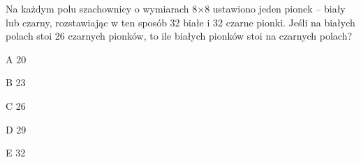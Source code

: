 \begin{tresc}
Na każdym polu szachownicy o wymiarach 8×8 ustawiono jeden pionek – biały lub czarny, rozstawiając w ten sposób 32 białe i 32 czarne pionki. Jeśli na białych polach stoi 26 czarnych pionków, to ile białych pionków stoi na czarnych polach?
\end{tresc}
\begin{wariant}{A} 20 \end{wariant}
\begin{wariant}{B} 23 \end{wariant}
\begin{wariant}{C} 26 \end{wariant}
\begin{wariant}{D} 29 \end{wariant}
\begin{wariant}{E} 32 \end{wariant}
